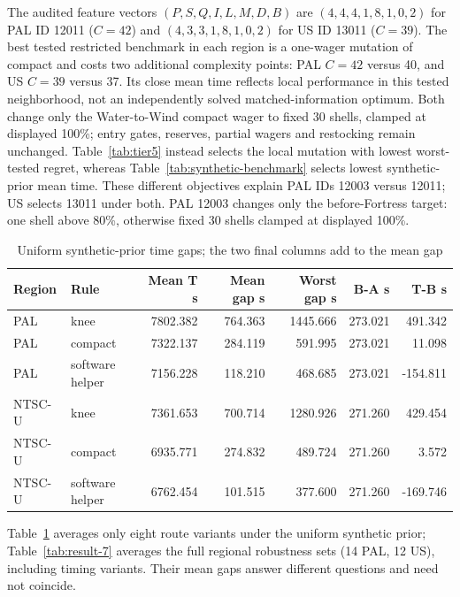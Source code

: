 \documentclass[11pt]{article}
\theoremstyle{definition}\newtheorem{definition}[theorem]{Definition}
\begin{document}
The audited feature vectors $(P,S,Q,I,L,M,D,B)$ are $(4,4,4,1,8,1,0,2)$ for PAL ID 12011 ($C=42$) and $(4,3,3,1,8,1,0,2)$ for US ID 13011 ($C=39$). The best tested restricted benchmark in each region is a one-wager mutation of compact and costs two additional complexity points: PAL $C=42$ versus 40, and US $C=39$ versus 37. Its close mean time reflects local performance in this tested neighborhood, not an independently solved matched-information optimum. Both change only the Water-to-Wind compact wager to fixed 30 shells, clamped at displayed 100\%; entry gates, reserves, partial wagers and restocking remain unchanged. Table~\ref{tab:tier5} instead selects the local mutation with lowest worst-tested regret, whereas Table~\ref{tab:synthetic-benchmark} selects lowest synthetic-prior mean time. These different objectives explain PAL IDs 12003 versus 12011; US selects 13011 under both. PAL 12003 changes only the before-Fortress target: one shell above 80\%, otherwise fixed 30 shells clamped at displayed 100\%.
\begin{table}[H]\centering\small
\begin{tabular}{llrrrrr}\toprule
Region & Rule & Mean T s & Mean gap s & Worst gap s & B-A s & T-B s\\\midrule
PAL & knee & 7802.382 & 764.363 & 1445.666 & 273.021 & 491.342\\
PAL & compact & 7322.137 & 284.119 & 591.995 & 273.021 & 11.098\\
PAL & software helper & 7156.228 & 118.210 & 468.685 & 273.021 & -154.811\\
NTSC-U & knee & 7361.653 & 700.714 & 1280.926 & 271.260 & 429.454\\
NTSC-U & compact & 6935.771 & 274.832 & 489.724 & 271.260 & 3.572\\
NTSC-U & software helper & 6762.454 & 101.515 & 377.600 & 271.260 & -169.746\\
\bottomrule\end{tabular}
\caption{Uniform synthetic-prior time gaps; the two final columns add to the mean gap}\label{tab:synthetic-gaps}\end{table}
Table~\ref{tab:synthetic-gaps} averages only eight route variants under the uniform synthetic prior; Table~\ref{tab:result-7} averages the full regional robustness sets (14 PAL, 12 US), including timing variants. Their mean gaps answer different questions and need not coincide.
\end{document}
